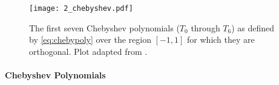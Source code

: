 \begin{figure}[t]
    \centering
    \texttt{[image: 2\_chebyshev.pdf]}
    \caption{
        The first seven Chebyshev polynomials ($T_0$ through $T_{6}$) as defined by \autoref{eq:chebypoly} over the region $[-1, 1]$ for which they are orthogonal.
        Plot adapted from \citep{numerical_recipes}.\protect\footnotemark
    }
    \label{fig:chebyshev}
\end{figure}

\paragraph{Chebyshev Polynomials}

